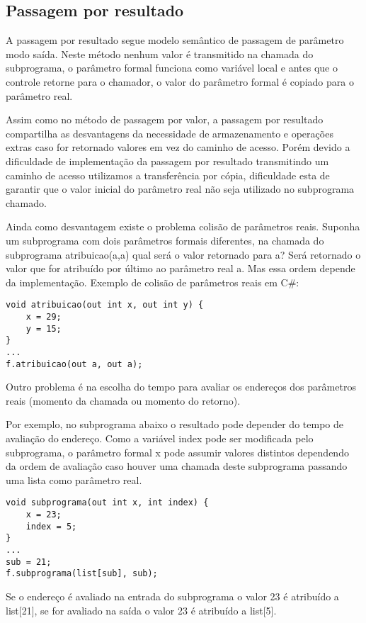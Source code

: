 \subsection{Passagem por resultado}
A passagem por resultado segue modelo semântico de passagem de parâmetro modo saída. Neste método nenhum valor é transmitido na chamada do subprograma, o parâmetro formal funciona como variável local e antes que o controle retorne para o chamador, o valor do parâmetro formal é copiado para o parâmetro real.

Assim como no método de passagem por valor, a passagem por resultado compartilha as desvantagens da necessidade de armazenamento e operações extras caso for retornado valores em vez do caminho de acesso. Porém devido a dificuldade de implementação da passagem por resultado transmitindo um caminho de acesso utilizamos a transferência por cópia, dificuldade esta de garantir que o valor inicial do parâmetro real não seja utilizado no subprograma chamado.

Ainda como desvantagem existe o problema colisão de parâmetros reais. Suponha um subprograma com dois parâmetros formais diferentes, na chamada do subprograma atribuicao(a,a) qual será o valor retornado para a? Será retornado o valor que for atribuído por último ao parâmetro real a. Mas essa ordem depende da implementação. Exemplo de colisão de parâmetros reais em C\#:

\begin{verbatim}
void atribuicao(out int x, out int y) {
    x = 29;
    y = 15;
}
...
f.atribuicao(out a, out a);
\end{verbatim}

Outro problema é na escolha do tempo para avaliar os endereços dos parâmetros reais (momento da chamada ou momento do retorno). 

Por exemplo, no subprograma abaixo o resultado pode depender do tempo de avaliação do endereço. Como a variável index pode ser modificada pelo subprograma, o parâmetro formal x pode assumir valores distintos dependendo da ordem de avaliação caso houver uma chamada deste subprograma passando uma lista como parâmetro real.

\begin{verbatim}
void subprograma(out int x, int index) {
    x = 23;
    index = 5;
}
...
sub = 21;
f.subprograma(list[sub], sub);
\end{verbatim}

Se o endereço é avaliado na entrada do subprograma o valor 23 é atribuído a list[21], se for avaliado na saída o valor 23 é atribuído a list[5].


